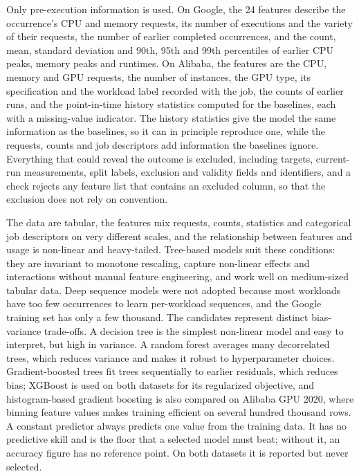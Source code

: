 \documentclass{IEEEtran}
\begin{document}
Only pre-execution information is used. On Google, the 24 features describe the occurrence's CPU and memory requests, its number of executions and the variety of their requests, the number of earlier completed occurrences, and the count, mean, standard deviation and 90th, 95th and 99th percentiles of earlier CPU peaks, memory peaks and runtimes. On Alibaba, the features are the CPU, memory and GPU requests, the number of instances, the GPU type, its specification and the workload label recorded with the job, the counts of earlier runs, and the point-in-time history statistics computed for the baselines, each with a missing-value indicator. The history statistics give the model the same information as the baselines, so it can in principle reproduce one, while the requests, counts and job descriptors add information the baselines ignore. Everything that could reveal the outcome is excluded, including targets, current-run measurements, split labels, exclusion and validity fields and identifiers, and a check rejects any feature list that contains an excluded column, so that the exclusion does not rely on convention.

The data are tabular, the features mix requests, counts, statistics and categorical job descriptors on very different scales, and the relationship between features and usage is non-linear and heavy-tailed. Tree-based models suit these conditions: they are invariant to monotone rescaling, capture non-linear effects and interactions without manual feature engineering, and work well on medium-sized tabular data. Deep sequence models were not adopted because most workloads have too few occurrences to learn per-workload sequences, and the Google training set has only a few thousand. The candidates represent distinct bias-variance trade-offs. A decision tree is the simplest non-linear model and easy to interpret, but high in variance. A random forest averages many decorrelated trees, which reduces variance and makes it robust to hyperparameter choices. Gradient-boosted trees fit trees sequentially to earlier residuals, which reduces bias; XGBoost is used on both datasets for its regularized objective, and histogram-based gradient boosting is also compared on Alibaba GPU 2020, where binning feature values makes training efficient on several hundred thousand rows. A constant predictor always predicts one value from the training data. It has no predictive skill and is the floor that a selected model must beat; without it, an accuracy figure has no reference point. On both datasets it is reported but never selected.
\end{document}
